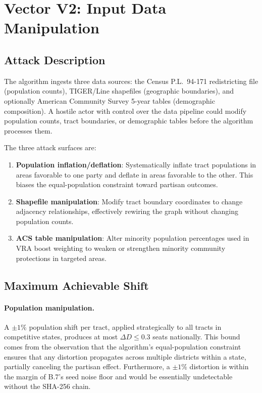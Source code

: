 \section{Vector V2: Input Data Manipulation}
\label{sec:v2}

\subsection{Attack Description}

The \bisect{} algorithm ingests three data sources: the Census P.L.\ 94-171
redistricting file (population counts), TIGER/Line shapefiles (geographic
boundaries), and optionally American Community Survey 5-year tables
(demographic composition).
A hostile actor with control over the data pipeline could modify population
counts, tract boundaries, or demographic tables before the algorithm
processes them.

The three attack surfaces are:
\begin{enumerate}
\item \textbf{Population inflation/deflation}: Systematically inflate tract
  populations in areas favorable to one party and deflate in areas favorable
  to the other.
  This biases the equal-population constraint toward partisan outcomes.
\item \textbf{Shapefile manipulation}: Modify tract boundary coordinates to
  change adjacency relationships, effectively rewiring the graph without
  changing population counts.
\item \textbf{ACS table manipulation}: Alter minority population percentages
  used in VRA boost weighting to weaken or strengthen minority community
  protections in targeted areas.
\end{enumerate}

\subsection{Maximum Achievable Shift}

\paragraph{Population manipulation.}
A $\pm 1\%$ population shift per tract, applied strategically to all tracts
in competitive states, produces at most $\Delta D \leq 0.3$ seats nationally.
This bound comes from the observation that the algorithm's equal-population
constraint ensures that any distortion propagates across multiple districts
within a state, partially canceling the partisan effect.
Furthermore, a $\pm 1\%$ distortion is within the margin of B.7's seed
noise floor and would be essentially undetectable without the SHA-256 chain.

